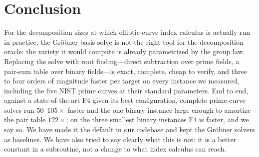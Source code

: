 \documentclass[10pt,a4paper]{article}
\theoremstyle{remark}
\begin{document}
\section{Conclusion}

For the decomposition sizes at which elliptic-curve index calculus is
actually run in practice, the Gr\"obner-basis solve is not the right
tool for the decomposition oracle: the variety it would compute is
already parametrized by the group law. Replacing the solve with root
finding---direct subtraction over prime fields, a pair-sum table over
binary fields---is exact, complete, cheap to verify, and three to four
orders of magnitude faster per target on every instance we measured,
including the five NIST prime curves at their standard parameters. End
to end, against a state-of-the-art F4 given its best configuration,
complete prime-curve solves run $50$--$105\times$ faster and the one binary
instance large enough to amortize the pair table $122\times$; on the
three smallest binary instances F4 is faster, and we say so. We
have made it the default in our codebase and kept the Gr\"obner solvers
as baselines. We have also tried to say clearly what this is not: it is
a better constant in a subroutine, not a change to what index calculus
can reach.
\end{document}
